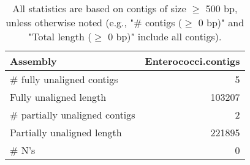 \documentclass[12pt,a4paper]{article}
\begin{document}
\begin{table}[ht]
\begin{center}
\caption{All statistics are based on contigs of size $\geq$ 500 bp, unless otherwise noted (e.g., "\# contigs ($\geq$ 0 bp)" and "Total length ($\geq$ 0 bp)" include all contigs).}
\begin{tabular}{|l*{1}{|r}|}
\hline
Assembly & Enterococci.contigs \\ \hline
\# fully unaligned contigs & 5 \\ \hline
Fully unaligned length & 103207 \\ \hline
\# partially unaligned contigs & 2 \\ \hline
Partially unaligned length & 221895 \\ \hline
\# N's & 0 \\ \hline
\end{tabular}
\end{center}
\end{table}
\end{document}
